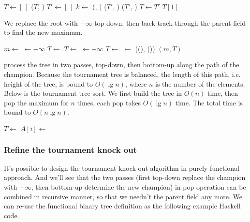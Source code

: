 \documentclass[b5paper]{article}
\begin{document}
\begin{algorithmic}[1]
  \State $T \gets [\ ]$
    \State {}($T$, )
  \EndFor
    \State $T' \gets [\ ]$
      \State $k \gets$ (, )
      \State {}($T'$, )
    \EndFor
      \State {}($T'$, )
    \EndIf
    \State $T \gets T'$
  \EndWhile
  \State \Return $T[1]$
\EndFunction
\end{algorithmic}

We replace the root with $-\infty$ top-down, then back-track through the parent field to find the new maximum.

\begin{algorithmic}[1]
  \State $m \gets$ 
  \State {} $\gets -\infty$
    
      \State $T \gets$ 
    \Else
      \State $T \gets$ 
    \EndIf
    \State {} $\gets -\infty$
  \EndWhile
   
    \State $T \gets$ 
    \State {} $\gets$ ((), ())
  \EndWhile
  \State \Return $(m, T)$ 
\EndFunction
\end{algorithmic}

 process the tree in two passes, top-down, then bottom-up along the path of the champion. Because the tournament tree is balanced, the length of this path, i.e. height of the tree, is bound to $O(\lg n)$, where $n$ is the number of the elements. Below is the tournament tree sort. We first build the tree in $O(n)$ time, then pop the maximum for $n$ times, each pop takes $O(\lg n)$ time. The total time is bound to $O(n \lg n)$.

\begin{algorithmic}
  \State $T \gets$ 
    \State $A[i] \gets$ 
  \EndFor
\EndProcedure
\end{algorithmic}

\subsubsection{Refine the tournament knock out}
It's possible to design the tournament knock out algorithm in purely functional approach. And we'll see
that the two passes (first top-down replace the champion with $-\infty$, then bottom-up determine the
new champion) in pop operation can be combined in recursive manner, so that we needn't the parent field
any more. We can re-use the functional binary tree definition as the following example Haskell code.
\end{document}
